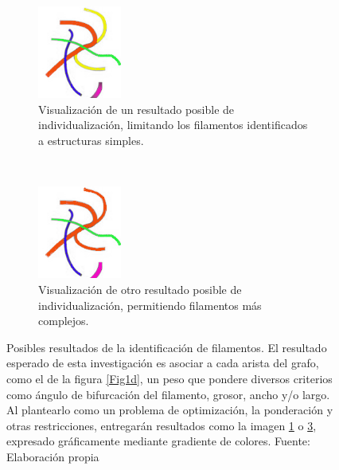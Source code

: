 \documentclass{article}
\begin{document}
\medskip

\begin{figure}[h]
    \begin{subfigure}[t]{0.5\textwidth}
        \centering
        \includegraphics[height=1.2in]{define-weighted-4-expected2.png}
        \caption{Visualizaci\'on de un resultado posible de individualizaci\'on, limitando los filamentos identificados a estructuras simples.}
        \label{Fig2a}
    \end{subfigure}%
    ~ 
    \begin{subfigure}[t]{0.5\textwidth}
        \centering
        \includegraphics[height=1.2in]{define-weighted-4-expected1.png}
        \caption{Visualizaci\'on de otro resultado posible de individualizaci\'on, permitiendo filamentos m\'as complejos.}
        \label{Fig2b}
    \end{subfigure}
	\caption{Posibles resultados de la identificaci\'on de filamentos. El resultado esperado de esta investigaci\'on es asociar a cada arista del grafo, como el de la figura \ref{Fig1d}, un peso que pondere diversos criterios como \'angulo de bifurcaci\'on del filamento, grosor, ancho y/o largo. Al plantearlo como un problema de optimizaci\'on, la ponderaci\'on y otras restricciones, entregar\'an resultados como la imagen \ref{Fig2a} o \ref{Fig2b}, expresado gr\'aficamente mediante gradiente de colores. Fuente: Elaboraci\'on propia}
\end{figure}
\end{document}
